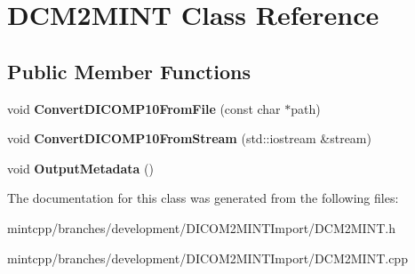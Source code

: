 \hypertarget{class_d_c_m2_m_i_n_t}{
\section{DCM2MINT Class Reference}
\label{class_d_c_m2_m_i_n_t}
}
\subsection*{Public Member Functions}
\begin{DoxyCompactItemize}
\item 
\hypertarget{class_d_c_m2_m_i_n_t_a9feccef11427b5ff4ec457d9c320f994}{
void {\bfseries ConvertDICOMP10FromFile} (const char $\ast$path)}
\label{class_d_c_m2_m_i_n_t_a9feccef11427b5ff4ec457d9c320f994}

\item 
\hypertarget{class_d_c_m2_m_i_n_t_aa44bb468ebf084691f4e3d87e3188134}{
void {\bfseries ConvertDICOMP10FromStream} (std::iostream \&stream)}
\label{class_d_c_m2_m_i_n_t_aa44bb468ebf084691f4e3d87e3188134}

\item 
\hypertarget{class_d_c_m2_m_i_n_t_a044adfbab231feaf5b9638fe1a43ca82}{
void {\bfseries OutputMetadata} ()}
\label{class_d_c_m2_m_i_n_t_a044adfbab231feaf5b9638fe1a43ca82}

\end{DoxyCompactItemize}


The documentation for this class was generated from the following files:\begin{DoxyCompactItemize}
\item 
mintcpp/branches/development/DICOM2MINTImport/DCM2MINT.h\item 
mintcpp/branches/development/DICOM2MINTImport/DCM2MINT.cpp\end{DoxyCompactItemize}
